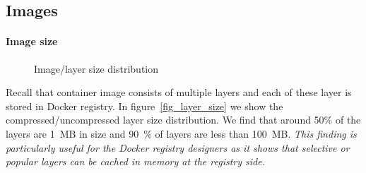\subsection{Images}
\label{sec:images}

\paragraph{Image size}%
\begin{figure}[!t]
	\centering

	\caption{Image/layer size distribution}
	\label{fig:image-layer-size}
\end{figure}
Recall that container image consists of multiple layers and each of these layer
is stored in Docker registry. In figure~\ref{fig_layer_size} we show the compressed/uncompressed layer
size distribution. We find that around 50\% of the layers are 1~MB in size and
90~\% of layers are less than 100~MB. \emph{This finding is particularly useful for
the Docker registry designers as it shows that selective or popular layers can
be cached in memory at the registry side.}

